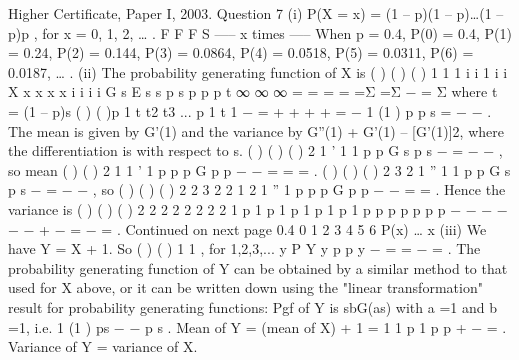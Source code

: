 \documentclass[a4paper,12pt]{article}
\begin{document}
Higher Certificate, Paper I, 2003. Question 7
(i) P(X = x) = (1 – p)(1 – p)…(1 – p)p , for x = 0, 1, 2, … .
F F F S
----- x times -----
When p = 0.4, P(0) = 0.4, P(1) = 0.24, P(2) = 0.144, P(3) = 0.0864,
P(4) = 0.0518, P(5) = 0.0311, P(6) = 0.0187, … .
(ii) The probability generating function of X is
( ) ( ) ( )
1 1 1
i i 1 i i X x x x x
i
i i i
G s E s s p s p p p t
∞ ∞ ∞
= = =
= =Σ =Σ − = Σ where t = (1 – p)s
( ) ( )p 1 t t2 t3 ... p 1 t 1 − = + + + + = −
1 (1 )
p
p s
=
− −
.
The mean is given by G'(1) and the variance by G''(1) + G'(1) – [G'(1)]2, where
the differentiation is with respect to s.
( ) ( )
{ ( ) }2
1
'
1 1
p p
G s
p s
−
=
− −
, so mean ( ) ( )
2
1 1 ' 1
p p p G
p p
− − = = = .
( ) ( )
{ ( ) }
2
3
2 1
''
1 1
p p
G s
p s
−
=
− −
, so ( ) ( ) ( ) 2 2
3 2
2 1 2 1
'' 1
p p p
G
p p
− −
= = .
Hence the variance is ( ) ( ) ( ) 2 2 2
2 2 2 2
2 1 p 1 p 1 p 1 p 1 p 1 p
p p p p p p
− − − − − − + − = − = .
Continued on next page
0.4
0 1 2 3 4 5 6
P(x)
…
x
(iii) We have Y = X + 1.
So ( ) ( ) 1 1 , for 1,2,3,... y P Y y p p y − = = − = .
The probability generating function of Y can be obtained by a similar method
to that used for X above, or it can be written down using the "linear
transformation" result for probability generating functions:
Pgf of Y is sbG(as) with a =1 and b =1, i.e. 1 (1 )
ps
− − p s
.
Mean of Y = (mean of X) + 1 = 1 1 p 1
p p
+ − = .
Variance of Y = variance of X.
\end{document}
